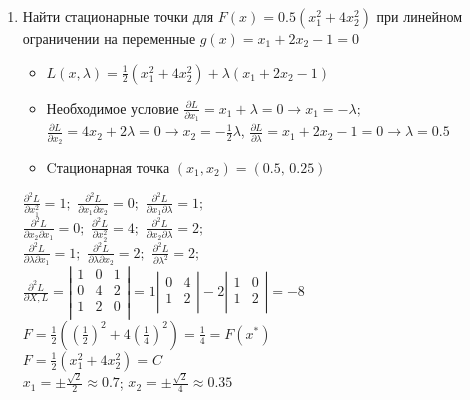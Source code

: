 \documentclass[preprint,russian,a5paper,10pt,twoside,mediummath]{ncc}
\begin{document}
\begin{enumerate}[resume]
\item Найти стационарные точки для $F\left( x \right)=0.5\left( x_{1}^{2}+4x_{2}^{2} \right)$ при линейном ограничении на переменные $g\left( x \right)={{x}_{1}}+2{{x}_{2}}-1=0$ 
\begin{itemize}
\item $L\left( x,\lambda  \right)=\frac{1}{2}\left( x_{1}^{2}+4x_{2}^{2} \right)+\lambda \left( {{x}_{1}}+2{{x}_{2}}-1 \right)$
\item Необходимое условие $\frac{\partial L}{\partial {{x}_{1}}}={{x}_{1}}+\lambda =0\to {{x}_{1}}=-\lambda ;$ $\frac{\partial L}{\partial {{x}_{2}}}=4{{x}_{2}}+2\lambda =0\to {{x}_{2}}=-\frac{1}{2}\lambda $, $\frac{\partial L}{\partial \lambda }={{x}_{1}}+2{{x}_{2}}-1=0\to \lambda =0.5$
\item Cтационарная точка $\left( {{x}_{1}},{{x}_{2}} \right)=\left( 0.5,\,0.25 \right)$
\end{itemize}


$\frac{{{\partial }^{2}}L}{\partial x_{1}^{2}}=1;$ $\frac{{{\partial }^{2}}L}{\partial {{x}_{1}}\partial {{x}_{2}}}=0;$ $\frac{{{\partial }^{2}}L}{\partial {{x}_{1}}\partial \lambda }=1;$ 
\\$\frac{{{\partial }^{2}}L}{\partial {{x}_{2}}\partial {{x}_{1}}}=0;$ $\frac{{{\partial }^{2}}L}{\partial x_{2}^{2}}=4;$ $\frac{{{\partial }^{2}}L}{\partial {{x}_{2}}\partial \lambda }=2;$
\\$\frac{{{\partial }^{2}}L}{\partial \lambda \partial {{x}_{1}}}=1;$ $\frac{{{\partial }^{2}}L}{\partial \lambda \partial {{x}_{2}}}=2;$ $\frac{{{\partial }^{2}}L}{\partial {{\lambda }^{2}}}=2;$
\\$\frac{{{\partial }^{2}}L}{\partial X,L}=\left| \begin{matrix}
   1 & 0 & 1  \\
   0 & 4 & 2  \\
   1 & 2 & 0  \\
\end{matrix} \right|=1\left| \begin{matrix}
   0 & 4  \\
   1 & 2  \\
\end{matrix} \right|-2\left| \begin{matrix}
   1 & 0  \\
   1 & 2  \\
\end{matrix} \right|=-8$
\\$F=\frac{1}{2}\left( {{\left( \frac{1}{2} \right)}^{2}}+4{{\left( \frac{1}{4} \right)}^{2}} \right)=\frac{1}{4}=F\left( {{x}^{*}} \right)$
\\$F=\frac{1}{2}\left( x_{1}^{2}+4x_{2}^{2} \right)=C$ 
\\${{x}_{1}}=\pm \frac{\sqrt{2}}{2}\approx 0.7$; ${{x}_{2}}=\pm \frac{\sqrt{2}}{4}\approx 0.35$
\end{enumerate}
\end{document}

